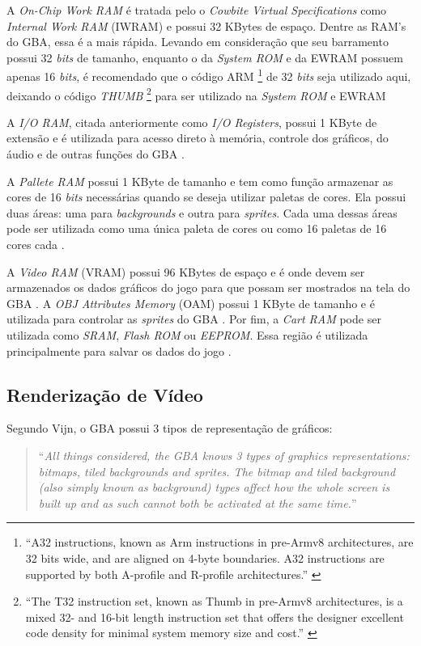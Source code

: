 A \textit{On-Chip Work RAM} é tratada pelo o \textit{Cowbite Virtual Specifications} como \textit{Internal Work RAM} (IWRAM) e possui 32 KBytes de espaço. Dentre as RAM's do GBA, essa é a mais rápida. Levando em consideração que seu barramento possui 32 \textit{bits} de tamanho, enquanto o da \textit{System ROM} e da EWRAM possuem apenas 16 \textit{bits}, é recomendado que o código ARM \footnote{``A32 instructions, known as Arm instructions in pre-Armv8 architectures, are 32 bits wide, and are aligned on 4-byte boundaries. A32 instructions are supported by both A-profile and R-profile architectures.'' \cite{arm}} de 32 \textit{bits} seja utilizado aqui, deixando o código \textit{THUMB} \footnote{``The T32 instruction set, known as Thumb in pre-Armv8 architectures, is a mixed 32- and 16-bit length instruction set that offers the designer excellent code density for minimal system memory size and cost.'' \cite{arm}} para ser utilizado na \textit{System ROM} e EWRAM \cite{cowbite}

A \textit{I/O RAM}, citada anteriormente como \textit{I/O Registers}, possui 1 KByte de extensão e é utilizada para acesso direto à memória, controle dos gráficos, do áudio e de outras funções do GBA \cite{cowbite}.

A \textit{Pallete RAM} possui 1 KByte de tamanho e tem como função armazenar as cores de 16 \textit{bits} necessárias quando se deseja utilizar paletas de cores. Ela possui duas áreas: uma para \textit{backgrounds} e outra para \textit{sprites}. Cada uma dessas áreas pode ser utilizada como uma única paleta de cores ou como 16 paletas de 16 cores cada \cite{cowbite}.

A \textit{Video RAM} (VRAM) possui 96 KBytes de espaço e é onde devem ser armazenados os dados gráficos do jogo para que possam ser mostrados na tela do GBA \cite{cowbite}. A \textit{OBJ Attributes Memory} (OAM) possui 1 KByte de tamanho e é utilizada para controlar as \textit{sprites} do GBA \cite{cowbite}. Por fim, a \textit{Cart RAM} pode ser utilizada como \textit{SRAM}, \textit{Flash ROM} ou \textit{EEPROM}. Essa região é utilizada principalmente para salvar os dados do jogo \cite{cowbite}.

\subsection{Renderização de Vídeo}

Segundo Vijn, o GBA possui 3 tipos de representação de gráficos: \begin{quote}``\textit{All things considered, the GBA knows 3 types of graphics representations: bitmaps, tiled backgrounds and sprites. The bitmap and tiled background (also simply known as background) types affect how the whole screen is built up and as such cannot both be activated at the same time.}'' \cite[p. 38]{tonc}\end{quote}

